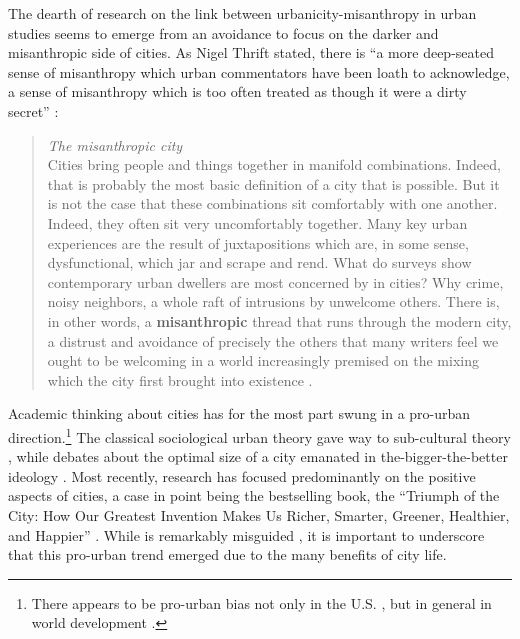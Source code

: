 \documentclass[11pt, letterpaper]{article}
\begin{document}
\begin{spacing}{1.4}
The dearth of research on the link between urbanicity-misanthropy in urban studies seems to emerge from an avoidance to focus on the darker and misanthropic side of cities. As Nigel Thrift stated, there is ``a more deep-seated sense of misanthropy which urban commentators have been loath to acknowledge, a sense of misanthropy which is too often treated as though it were a dirty secret'' \citep[p. 134]{thrift05}: 
\begin{quote}
  \textit{The misanthropic city}\\
  Cities bring people and things together in manifold combinations. Indeed, that is probably the most basic
definition of a city that is possible. But it is not the case that these combinations sit comfortably with one
another. Indeed, they often sit very uncomfortably together. Many key urban experiences are the result of
juxtapositions which are, in some sense, dysfunctional, which jar and scrape and rend. What do surveys
show contemporary urban dwellers are most concerned by in cities? Why crime, noisy neighbors, a whole
raft of intrusions by unwelcome others. There is, in other words, a \textbf{misanthropic} thread that runs through
the modern city, a distrust and avoidance of precisely the others that many writers feel we ought to be
welcoming in a world increasingly premised on the mixing which the city first brought into existence \citep[p. 140 (``misanthropic'' bolded by us]{thrift05}.
\end{quote}

Academic thinking about cities has for the most part swung in a pro-urban direction.\footnote{There appears to be pro-urban bias not only in the U.S. \cite{hansonCityJournalautumn15}, but in general in world development \citep{lipton77}.} The classical sociological urban theory \citep{wirth38,milgram70,park15,park84,simmel03,tonnies57} gave way to
  sub-cultural theory \citep{fischer75,fischer95,wilson85, palisi83}, while debates about the optimal size of a city \citep{richardson72,singell74,alonso60,alonso71,elgin75,capello00} emanated in the-bigger-the-better ideology \citep{glaeser11}. Most recently, research has focused predominantly on the positive aspects of cities, a case in point being the bestselling book, the ``Triumph of the City: How Our Greatest Invention Makes Us Richer, Smarter, Greener, Healthier, and Happier'' \citep{glaeser11}. While \citet{glaeser11} is remarkably misguided  \citep{aokCityBook15,peck16}, it is important to underscore that this pro-urban trend emerged due to the many benefits of city life. 
   

\end{spacing}
\end{document}
